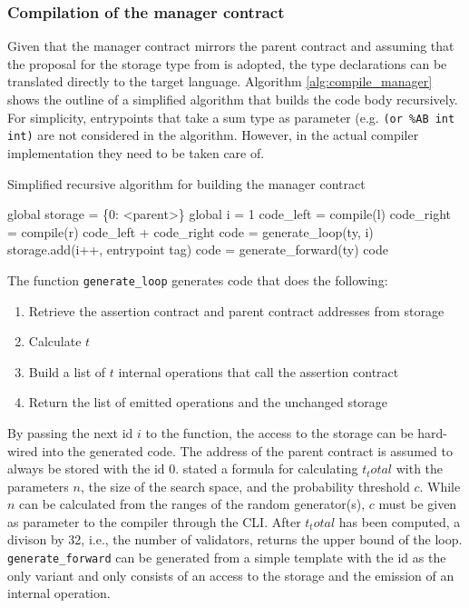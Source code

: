 \subsubsection{Compilation of the manager contract}
Given that the manager contract mirrors the parent contract and assuming that the proposal for the storage type from  is adopted, the type declarations can be translated directly to the target language. Algorithm \ref{alg:compile_manager} shows the outline of a simplified algorithm that builds the code body recursively. For simplicity, entrypoints that take a sum type as parameter (e.g. \texttt{(or \%AB int int)} are not considered in the algorithm. However, in the actual compiler implementation they need to be taken care of. 
\begin{algorithm}
\caption{Simplified recursive algorithm for building the manager contract}\label{alg:compile_manager}
	\begin{algorithmic}[0]
	\State global storage = \{0: <parent>\} 
	\State global i = 1 
	\State code\_left = compile(l)
	\State code\_right = compile(r)
	\State \Return code\_left + code\_right
	\Else
	\State code = generate\_loop(ty, i)
	\State storage.add(i++, entrypoint tag)
	\Else
	\State code = generate\_forward(ty)
	\EndIf
	\State \Return code
	\EndIf
	\EndFunction
	\end{algorithmic}
\end{algorithm}

The function \texttt{generate\_loop} generates code that does the following:
\begin{enumerate}
\item Retrieve the assertion contract and parent contract addresses from storage
\item Calculate $t$
\item Build a list of $t$ internal operations that call the assertion contract
\item Return the list of emitted operations and the unchanged storage
\end{enumerate}
By passing the next id $i$ to the function, the access to the storage can be hard-wired into the generated code. The address of the parent contract is assumed to always be stored with the id 0.  stated a formula for calculating $t_total$ with the parameters $n$, the size of the search space, and the probability threshold $c$. While $n$ can be calculated from the ranges of the random generator(s), $c$ must be given as parameter to the compiler through the CLI. After $t_total$ has been computed, a divison by 32, i.e., the number of validators, returns the upper bound of the loop. \\
\texttt{generate\_forward} can be generated from a simple template with the id as the only variant and only consists of  an access to the storage and the emission of an internal operation.

